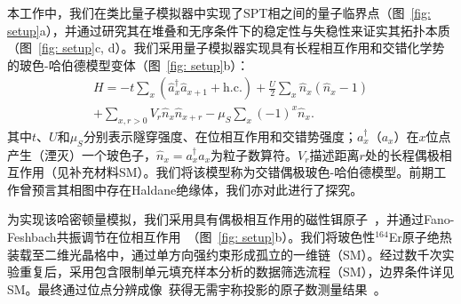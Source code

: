 \documentclass[preprint,superscriptaddress,floatfix, nofootinbib]{revtex4-2}
\begin{document}
本工作中，我们在类比量子模拟器中实现了SPT相之间的量子临界点（图~\ref{fig: setup}a），并通过研究其在堆叠和无序条件下的稳定性与失稳性来证实其拓扑本质（图~\ref{fig: setup}c, d）。我们采用量子模拟器\cite{Bloch2008, Gross2017, Bohrdt2021}实现具有长程相互作用和交错化学势的玻色-哈伯德模型变体（图~\ref{fig: setup}b）：
\begin{equation}
\label{eq: Hamiltonian}
\begin{split}
H=-t\sum_{x}(\hat{a}_x^\dag \hat{a}_{x + 1}+\mathrm{h.c.})+\frac{U}{2}\sum_x\hat{n}_x(\hat{n}_x-1) \\
+\sum_{x, r>0}V_{r}\hat{n}_x\hat{n}_{x + r} - \mu_S\sum_x(-1)^x\hat{n}_x.
\end{split}
\end{equation}
其中$t$、$U$和$\mu_S$分别表示隧穿强度、在位相互作用和交错势强度；$a_x^{\dagger}$（$a_x$）在$x$位点产生（湮灭）一个玻色子，$\hat{n}_x = a_x^{\dagger} a_x$为粒子数算符。$V_r$描述距离$r$处的长程偶极相互作用（见补充材料SM）。我们将该模型称为交错偶极玻色-哈伯德模型。前期工作\cite{Torre2006,Berg2008}曾预言其相图中存在Haldane绝缘体\cite{Haldane1983}，我们亦对此进行了探究。

为实现该哈密顿量模拟，我们采用具有偶极相互作用的磁性铒原子~\cite{Su2023}，并通过Fano-Feshbach共振调节在位相互作用~\cite{Chin2010}（图~\ref{fig: setup}b）。我们将玻色性$^{164}$Er原子绝热装载至二维光晶格中，通过单方向强约束形成孤立的一维链（SM）。经过数千次实验重复后，采用包含限制单元填充样本分析的数据筛选流程（SM），边界条件详见SM。最终通过位点分辨成像~\cite{Bakr2010, Sherson2010}获得无需宇称投影的原子数测量结果~\cite{Su2024}。
\end{document}

